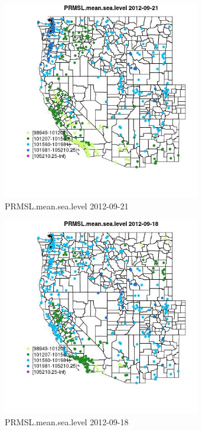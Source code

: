\begin{figure} 
\centering  
\includegraphics[width=0.77\textwidth]{Code_Outputs/Report_ML_input_PM25_Step4_part_e_de_duplicated_aves_compiled_2019-05-14wNAs_MapObsPRMSLmeansealevel2012-09-21.jpg} 
\caption{\label{fig:Report_ML_input_PM25_Step4_part_e_de_duplicated_aves_compiled_2019-05-14wNAsMapObsPRMSLmeansealevel2012-09-21}PRMSL.mean.sea.level 2012-09-21} 
\end{figure} 
 

\begin{figure} 
\centering  
\includegraphics[width=0.77\textwidth]{Code_Outputs/Report_ML_input_PM25_Step4_part_e_de_duplicated_aves_compiled_2019-05-14wNAs_MapObsPRMSLmeansealevel2012-09-18.jpg} 
\caption{\label{fig:Report_ML_input_PM25_Step4_part_e_de_duplicated_aves_compiled_2019-05-14wNAsMapObsPRMSLmeansealevel2012-09-18}PRMSL.mean.sea.level 2012-09-18} 
\end{figure} 
 

